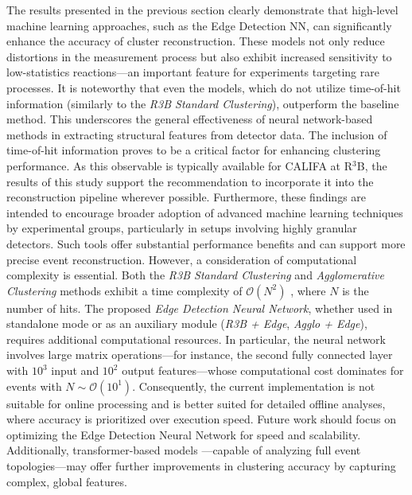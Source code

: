 \documentclass[final,5p,times,twocolumn]{elsarticle}
\begin{document}
The results presented in the previous section clearly demonstrate that high-level machine learning approaches, such as the Edge Detection NN, can significantly enhance the accuracy of cluster reconstruction. These models not only reduce distortions in the measurement process but also exhibit increased sensitivity to low-statistics reactions—an important feature for experiments targeting rare processes.\newline
It is noteworthy that even the models, which do not utilize time-of-hit information (similarly to the \textit{R3B Standard Clustering}), outperform the baseline method. This underscores the general effectiveness of neural network-based methods in extracting structural features from detector data.\newline
The inclusion of time-of-hit information proves to be a critical factor for enhancing clustering performance. As this observable is typically available for CALIFA at R$^3$B, the results of this study support the recommendation to incorporate it into the reconstruction pipeline wherever possible.\newline
Furthermore, these findings are intended to encourage broader adoption of advanced machine learning techniques by experimental groups, particularly in setups involving highly granular detectors. Such tools offer substantial performance benefits and can support more precise event reconstruction.\newline
However, a consideration of computational complexity is essential. Both the \textit{R3B Standard Clustering} and \textit{Agglomerative Clustering} methods exhibit a time complexity of $\mathcal{O}(N^2)$ \cite{sieranoja2025fast}, where $N$ is the number of hits. The proposed \textit{Edge Detection Neural Network}, whether used in standalone mode or as an auxiliary module (\textit{R3B + Edge}, \textit{Agglo + Edge}), requires additional computational resources. In particular, the neural network involves large matrix operations—for instance, the second fully connected layer with $10^3$ input and $10^2$ output features—whose computational cost dominates for events with $N \sim \mathcal{O}(10^1)$. Consequently, the current implementation is not suitable for online processing and is better suited for detailed offline analyses, where accuracy is prioritized over execution speed.\newline
Future work should focus on optimizing the Edge Detection Neural Network for speed and scalability. Additionally, transformer-based models \cite{vaswani2017attention}—capable of analyzing full event topologies—may offer further improvements in clustering accuracy by capturing complex, global features.
\end{document}
